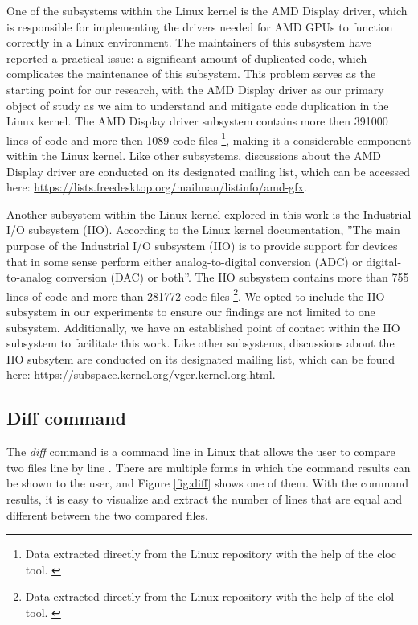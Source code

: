 One of the subsystems within the Linux kernel is the AMD Display driver, which
is responsible for implementing the drivers needed for AMD GPUs to function
correctly in a Linux environment. The maintainers of this subsystem have
reported a practical issue: a significant amount of duplicated code, which
complicates the maintenance of this subsystem. This problem serves as the
starting point for our research, with the AMD Display driver as our primary
object of study as we aim to understand and mitigate code duplication in the
Linux kernel. The AMD Display driver subsystem contains more then 391000 lines 
of code and more then 1089 code files
\footnote{ 
Data extracted directly from the Linux repository with the help of the cloc tool.
\citep{cloc}
}, 
making it a considerable component within the Linux kernel. Like other 
subsystems, discussions about the AMD Display driver are conducted on its 
designated mailing list, which can be accessed here: 
\url{https://lists.freedesktop.org/mailman/listinfo/amd-gfx}.

Another subsystem within the Linux kernel explored in this work is the
Industrial I/O subsystem (IIO). According to the Linux kernel documentation, 
''The main purpose of the Industrial I/O subsystem (IIO) is to provide support 
for devices that in some sense perform either analog-to-digital conversion (ADC) 
or digital-to-analog conversion (DAC) or both''\citep{iiodoc}. The IIO subsystem 
contains more than 755 lines of code and more than 281772 code files
\footnote{
Data extracted directly from the Linux repository with the help of the clol tool. \citep{cloc}
}.
We opted to include the IIO subsystem in our experiments to ensure our findings 
are not limited to one subsystem. Additionally, we have an established point of
contact within the IIO subsystem to facilitate this work.
Like other subsystems, discussions about the IIO subsytem are conducted on its 
designated mailing list, which can be found here: 
\url{https://subspace.kernel.org/vger.kernel.org.html}.


\subsection{Diff command}

The \textit{diff} command is a command line in Linux that allows the user to compare 
two files line by line \citep{diffcommand}. There are multiple forms in which the command 
results can be shown to the user, and Figure \ref{fig:diff} shows one of them. 
With the command results, it is easy to visualize and extract the number of lines that 
are equal and different between the two compared files.


